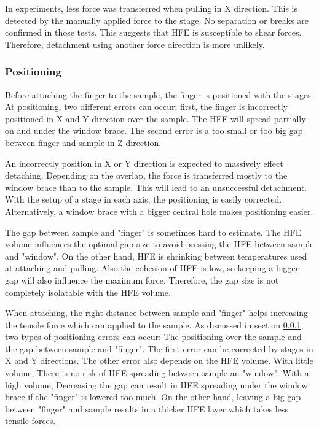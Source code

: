 In experiments, less force was transferred when pulling in X direction. This is detected by the manually applied force to the stage. No separation or breaks are confirmed in those tests. This suggests that HFE is susceptible to shear forces. Therefore, detachment using another force direction is more unlikely. 

\subsubsection{Positioning}
\label{section:positioning}

Before attaching the finger to the sample, the finger is positioned with the stages. At positioning, two different errors can occur: first, the finger is incorrectly positioned in X and Y direction over the sample. The HFE will spread partially on and under the window brace. The second error is a too small or too big gap between finger and sample in Z-direction. 

An incorrectly position in X or Y direction is expected to massively effect detaching. Depending on the overlap, the force is transferred mostly to the window brace than to the sample. This will lead to an unsuccessful detachment. With the setup of a stage in each axis, the positioning is easily corrected. Alternatively, a window brace with a bigger central hole makes positioning easier.

The gap between sample and "finger" is sometimes hard to estimate. The HFE volume influences the optimal gap size to avoid pressing the HFE between sample and "window". On the other hand, HFE is shrinking between temperatures used at attaching and pulling. Also the cohesion of HFE is low, so keeping a bigger gap will also influence the maximum force. Therefore, the gap size is not completely isolatable with the HFE volume.

When attaching, the right distance between sample and "finger" helps increasing the tensile force which can applied to the sample. As discussed in section \ref{section:positioning}, two types of positioning errors can occur: The positioning over the sample and the gap between sample and "finger". The first error can be corrected by stages in X and Y directions. The other error also depends on the HFE volume. With little volume, There is no risk of HFE spreading between sample an "window". With a high volume, Decreasing the gap can result in HFE spreading under the window brace if the "finger" is lowered too much. On the other hand, leaving a big gap between "finger" and sample results in a thicker HFE layer which takes less tensile forces.

